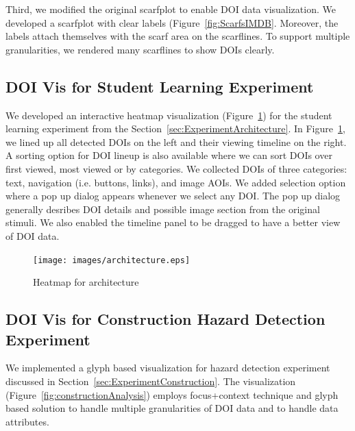 Third, we modified the original scarfplot to enable DOI data visualization. We developed a scarfplot with clear labels (Figure~\ref{fig:ScarfsIMDB}. Moreover, the labels attach themselves with the scarf area on the scarflines. To support multiple granularities, we rendered many scarflines to show DOIs clearly. 

\subsection{DOI Vis for Student Learning Experiment}
We developed an interactive heatmap visualization (Figure~\ref{fig:HeatmapArchitecture}) for the student learning experiment from the Section~\ref{sec:ExperimentArchitecture}. In Figure~\ref{fig:HeatmapArchitecture}, we lined up all detected DOIs on the left and their viewing timeline on the right. A sorting option for DOI lineup is also available where we can sort DOIs over first viewed, most viewed or by categories. We collected DOIs of three categories: text, navigation (i.e. buttons, links), and image AOIs. We added selection option where a pop up dialog appears whenever we select any DOI. The pop up dialog generally desribes DOI details and possible image section from the original stimuli. We also enabled the timeline panel to be dragged to have a better view of DOI data. 
\begin{figure}
  \centering
  \texttt{[image: images/architecture.eps]}
  \caption{Heatmap for architecture }
	\label{fig:HeatmapArchitecture}
\end{figure}

\subsection{DOI Vis for Construction Hazard Detection Experiment}
We implemented a glyph based visualization for hazard detection experiment discussed in Section~\ref{sec:ExperimentConstruction}. The visualization (Figure~\ref{fig:constructionAnalysis}) employs focus+context technique and glyph based solution to handle multiple granularities of DOI data and to handle data attributes. 

